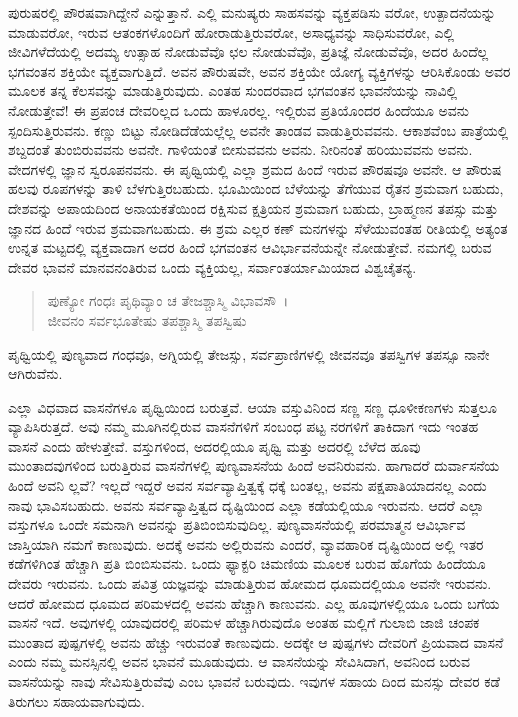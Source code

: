 ಪುರುಷರಲ್ಲಿ ಪೌರಷವಾಗಿದ್ದೇನೆ ಎನ್ನುತ್ತಾನೆ. ಎಲ್ಲಿ ಮನುಷ್ಯರು ಸಾಹಸವನ್ನು ವ್ಯಕ್ತಪಡಿಸು ವರೋ, ಉತ್ಪಾದನೆಯನ್ನು ಮಾಡುವರೋ, ಇರುವ ಆತಂಕಗಳೊಂದಿಗೆ ಹೋರಾಡುತ್ತಿರುವರೋ, ಅಸಾಧ್ಯವನ್ನು ಸಾಧಿಸುವರೋ, ಎಲ್ಲಿ ಜೀವಿಗಳೆದೆಯಲ್ಲಿ ಅದಮ್ಯ ಉತ್ಸಾಹ ನೋಡುವೆವೊ ಛಲ ನೋಡುವೆವೊ, ಪ್ರತಿಜ್ಞೆ ನೋಡುವೆವೊ, ಅದರ ಹಿಂದೆಲ್ಲ ಭಗವಂತನ ಶಕ್ತಿಯೇ ವ್ಯಕ್ತವಾಗುತ್ತಿದೆ. ಅವನ ಪೌರುಷವೇ, ಅವನ ಶಕ್ತಿಯೇ ಯೋಗ್ಯ ವ್ಯಕ್ತಿಗಳನ್ನು ಆರಿಸಿಕೊಂಡು ಅವರ ಮೂಲಕ ತನ್ನ ಕೆಲಸವನ್ನು ಮಾಡುತ್ತಿರುವುದು. ಎಂತಹ ಸುಂದರವಾದ ಭಗವಂತನ ಭಾವನೆಯನ್ನು ನಾವಿಲ್ಲಿ ನೋಡುತ್ತೇವೆ! ಈ ಪ್ರಪಂಚ ದೇವರಿಲ್ಲದ ಒಂದು ಹಾಳೂರಲ್ಲ. ಇಲ್ಲಿರುವ ಪ್ರತಿಯೊಂದರ ಹಿಂದೆಯೂ ಅವನು ಸ್ಪಂದಿಸುತ್ತಿರುವನು. ಕಣ್ಣು ಬಿಟ್ಟು ನೋಡಿದೆಡೆಯಲ್ಲೆಲ್ಲ ಅವನೇ ತಾಂಡವ ವಾಡುತ್ತಿರುವವನು. ಆಕಾಶವೆಂಬ ಪಾತ್ರೆಯಲ್ಲಿ ಶಬ್ದದಂತೆ ತುಂಬಿರುವವನು ಅವನೇ. ಗಾಳಿಯಂತೆ ಬೀಸುವವನು ಅವನು. ನೀರಿನಂತೆ ಹರಿಯುವವನು ಅವನು. ವೇದಗಳಲ್ಲಿ ಜ್ಞಾನ ಸ್ವರೂಪನವನು. ಈ ಪೃಥ್ವಿಯಲ್ಲಿ ಎಲ್ಲಾ ಶ್ರಮದ ಹಿಂದೆ ಇರುವ ಪೌರಷವೂ ಅವನೇ. ಆ ಪೌರುಷ ಹಲವು ರೂಪಗಳನ್ನು ತಾಳಿ ಬೆಳಗುತ್ತಿರಬಹುದು. ಭೂಮಿಯಿಂದ ಬೆಳೆಯನ್ನು ತೆಗೆಯುವ ರೈತನ ಶ್ರಮವಾಗ ಬಹುದು, ದೇಶವನ್ನು ಅಪಾಯದಿಂದ ಅನಾಯಕತೆಯಿಂದ ರಕ್ಷಿಸುವ ಕ್ಷತ್ರಿಯನ ಶ್ರಮವಾಗ ಬಹುದು, ಬ್ರಾಹ್ಮಣನ ತಪಸ್ಸು ಮತ್ತು ಜ್ಞಾನದ ಹಿಂದೆ ಇರುವ ಶ್ರಮವಾಗಬಹುದು. ಈ ಶ್ರಮ ಎಲ್ಲರ ಕಣ್ ಮನಗಳನ್ನು ಸೆಳೆಯುವಂತಹ ರೀತಿಯಲ್ಲಿ ಅತ್ಯಂತ ಉನ್ನತ ಮಟ್ಟದಲ್ಲಿ ವ್ಯಕ್ತವಾದಾಗ ಅದರ ಹಿಂದೆ ಭಗವಂತನ ಆವಿರ್ಭಾವನೆಯನ್ನೇ ನೋಡುತ್ತೇವೆ. ನಮಗಲ್ಲಿ ಬರುವ ದೇವರ ಭಾವನೆ ಮಾನವನಂತಿರುವ ಒಂದು ವ್ಯಕ್ತಿಯಲ್ಲ, ಸರ್ವಾಂತರ್ಯಾಮಿಯಾದ ವಿಶ್ವಚೈತನ್ಯ.

\begin{verse}
ಪುಣ್ಯೋ ಗಂಧಃ ಪೃಥಿವ್ಯಾಂ ಚ ತೇಜಶ್ಚಾಸ್ಮಿ ವಿಭಾವಸೌ~।\\ಜೀವನಂ ಸರ್ವಭೂತೇಷು ತಪಶ್ಚಾಸ್ಮಿ ತಪಸ್ವಿಷು 
\end{verse}

{\small ಪೃಥ್ವಿಯಲ್ಲಿ ಪುಣ್ಯವಾದ ಗಂಧವೂ, ಅಗ್ನಿಯಲ್ಲಿ ತೇಜಸ್ಸು, ಸರ್ವಪ್ರಾಣಿಗಳಲ್ಲಿ ಜೀವನವೂ ತಪಸ್ವಿಗಳ ತಪಸ್ಸೂ ನಾನೇ ಆಗಿರುವೆನು. }

ಎಲ್ಲಾ ವಿಧವಾದ ವಾಸನೆಗಳೂ ಪೃಥ್ವಿಯಿಂದ ಬರುತ್ತವೆ. ಆಯಾ ವಸ್ತುವಿನಿಂದ ಸಣ್ಣ ಸಣ್ಣ ಧೂಳೀಕಣಗಳು ಸುತ್ತಲೂ ವ್ಯಾಪಿಸಿರುತ್ತದೆ. ಅವು ನಮ್ಮ ಮೂಗಿನಲ್ಲಿರುವ ವಾಸನೆಗಳಿಗೆ ಸಂಬಂಧ ಪಟ್ಟ ನರಗಳಿಗೆ ತಾಕಿದಾಗ ಇದು ಇಂತಹ ವಾಸನೆ ಎಂದು ಹೇಳುತ್ತೇವೆ. ವಸ್ತುಗಳಿಂದ, ಅದರಲ್ಲಿಯೂ ಪೃಥ್ವಿ ಮತ್ತು ಅದರಲ್ಲಿ ಬೆಳೆದ ಹೂವು ಮುಂತಾದವುಗಳಿಂದ ಬರುತ್ತಿರುವ ವಾಸನೆಗಳಲ್ಲಿ ಪುಣ್ಯವಾಸನೆಯ ಹಿಂದೆ ಅವನಿರುವನು. ಹಾಗಾದರೆ ದುರ್ವಾಸನೆಯ ಹಿಂದೆ ಅವನಿ ಲ್ಲವೆ? ಇಲ್ಲದೆ ಇದ್ದರೆ ಅವನ ಸರ್ವವ್ಯಾಪ್ತಿತ್ವಕ್ಕೆ ಧಕ್ಕೆ ಬಂತಲ್ಲ, ಅವನು ಪಕ್ಷಪಾತಿಯಾದನಲ್ಲ ಎಂದು ನಾವು ಭಾವಿಸಬಹುದು. ಅವನು ಸರ್ವವ್ಯಾಪ್ತಿತ್ವದ ದೃಷ್ಟಿಯಿಂದ ಎಲ್ಲಾ ಕಡೆಯಲ್ಲಿಯೂ ಇರುವನು. ಆದರೆ ಎಲ್ಲಾ ವಸ್ತುಗಳೂ ಒಂದೇ ಸಮನಾಗಿ ಅವನನ್ನು ಪ್ರತಿಬಿಂಬಿಸುವುದಿಲ್ಲ. ಪುಣ್ಯವಾಸನೆಯಲ್ಲಿ ಪರಮಾತ್ಮನ ಆವಿರ್ಭಾವ ಜಾಸ್ತಿಯಾಗಿ ನಮಗೆ ಕಾಣುವುದು. ಅದಕ್ಕೆ ಅವನು ಅಲ್ಲಿರುವನು ಎಂದರೆ, ವ್ಯಾವಹಾರಿಕ ದೃಷ್ಟಿಯಿಂದ ಅಲ್ಲಿ ಇತರ ಕಡೆಗಳಿಗಿಂತ ಹೆಚ್ಚಾಗಿ ಪ್ರತಿ ಬಿಂಬಿಸುವನು. ಒಂದು ಫ್ಯಾಕ್ಟರಿ ಚಿಮಣಿಯ ಮೂಲಕ ಬರುವ ಹೊಗೆಯ ಹಿಂದೆಯೂ ದೇವರು ಇರುವನು. ಒಂದು ಪವಿತ್ರ ಯಜ್ಞವನ್ನು ಮಾಡುತ್ತಿರುವ ಹೋಮದ ಧೂಮದಲ್ಲಿಯೂ ಅವನೇ ಇರುವನು. ಆದರೆ ಹೋಮದ ಧೂಮದ ಪರಿಮಳದಲ್ಲಿ ಅವನು ಹೆಚ್ಚಾಗಿ ಕಾಣುವನು. ಎಲ್ಲ ಹೂವುಗಳಲ್ಲಿಯೂ ಒಂದು ಬಗೆಯ ವಾಸನೆ ಇದೆ. ಅವುಗಳಲ್ಲಿ ಯಾವುದರಲ್ಲಿ ಪರಿಮಳ ಹೆಚ್ಚಾಗಿರುವುದೊ ಅಂತಹ ಮಲ್ಲಿಗೆ ಗುಲಾಬಿ ಜಾಜಿ ಚಂಪಕ ಮುಂತಾದ ಪುಷ್ಪಗಳಲ್ಲಿ ಅವನು ಹೆಚ್ಚು ಇರುವಂತೆ ಕಾಣುವುದು. ಅದಕ್ಕೇ ಆ ಪುಷ್ಪಗಳು ದೇವರಿಗೆ ಪ್ರಿಯವಾದ ವಾಸನೆ ಎಂದು ನಮ್ಮ ಮನಸ್ಸಿನಲ್ಲಿ ಅವನ ಭಾವನೆ ಮೂಡುವುದು. ಆ ವಾಸನೆಯನ್ನು ಸೇವಿಸಿದಾಗ, ಅವನಿಂದ ಬರುವ ವಾಸನೆಯನ್ನು ನಾವು ಸೇವಿಸುತ್ತಿರುವೆವು ಎಂಬ ಭಾವನೆ ಬರುವುದು. ಇವುಗಳ ಸಹಾಯ ದಿಂದ ಮನಸ್ಸು ದೇವರ ಕಡೆ ತಿರುಗಲು ಸಹಾಯವಾಗುವುದು.

